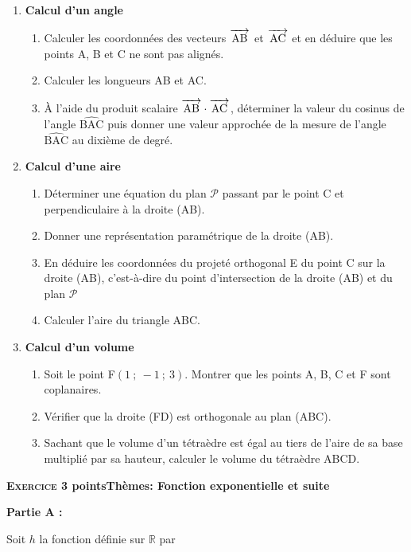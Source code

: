 \documentclass[11pt,a4paper,french]{article}
\newcommand{\R}{\mathbb{R}}
\newcommand{\vect}[1]{\overrightarrow{\,\mathstrut#1\,}}
\begin{document}
\begin{enumerate}
\item \textbf{Calcul d'un angle}
	\begin{enumerate}
		\item Calculer les coordonnées des vecteurs $\vect{\text{AB}}$ et $\vect{\text{AC}}$ et en déduire que les points A, B et C ne sont pas alignés.
		\item Calculer les longueurs AB et AC.
		\item À l'aide du produit scalaire $\vect{\text{AB}}\cdot \vect{\text{AC}}$, déterminer la valeur du cosinus de l'angle
$\widehat{\text{BAC}}$ puis donner une valeur approchée de la mesure de l'angle $\widehat{\text{BAC}}$ au dixième de degré.
	\end{enumerate}
\item \textbf{Calcul d'une aire}
	\begin{enumerate}
		\item Déterminer une équation du plan $\mathcal{P}$ passant par le point C et perpendiculaire à la droite (AB).
		\item Donner une représentation paramétrique de la droite (AB).
		\item En déduire les coordonnées du projeté orthogonal E du point C sur la droite
(AB), c'est-à-dire du point d'intersection de la droite (AB) et du plan $\mathcal{P}$
		\item Calculer l'aire du triangle ABC.
	\end{enumerate}
\item \textbf{Calcul d'un volume}
	\begin{enumerate}
		\item Soit le point F$(1~;~-1~;~3)$. Montrer que les points A, B, C et F sont coplanaires.
		\item Vérifier que la droite (FD) est orthogonale au plan (ABC).
		\item Sachant que le volume d'un tétraèdre est égal au tiers de l'aire de sa base
multiplié par sa hauteur, calculer le volume du tétraèdre ABCD.
	\end{enumerate}
\end{enumerate}

\bigskip

\textbf{\textsc{Exercice 3}  points\hfill Thèmes: Fonction exponentielle et suite}

\bigskip

\textbf{Partie A :}

\medskip

Soit $h$ la fonction définie sur $\R$ par
\end{document}
